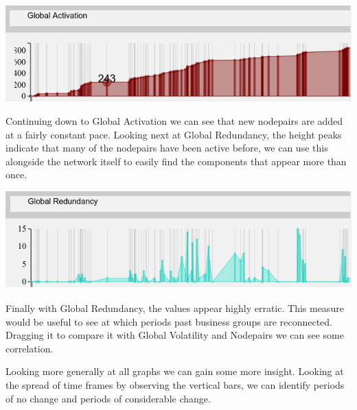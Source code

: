 \begin{center}
\includegraphics[trim={0 0 0 0}, width=140mm]{./Figures/TurinGlobalActivation.png}
\end{center}       
Continuing down to Global Activation we can see that new nodepairs are added at a fairly constant pace. Looking next at Global Redundancy, the height peaks indicate that many of the nodepairs have been active before, we can use this alongside the network itself to easily find the components that appear more than once.
    
\begin{center}
\includegraphics[trim={0 0 0 0}, width=140mm]{./Figures/TurinGlobalRedundancy.png}
\end{center}
Finally with Global Redundancy, the values appear highly erratic. This measure would be useful to see at which periods past business groups are reconnected. Dragging it to compare it with Global Volatility and Nodepairs we can see some correlation.


Looking more generally at all graphs we can gain some more insight. Looking at the spread of time frames by observing the vertical bars, we can identify periods of no change and periods of considerable change. 
    
